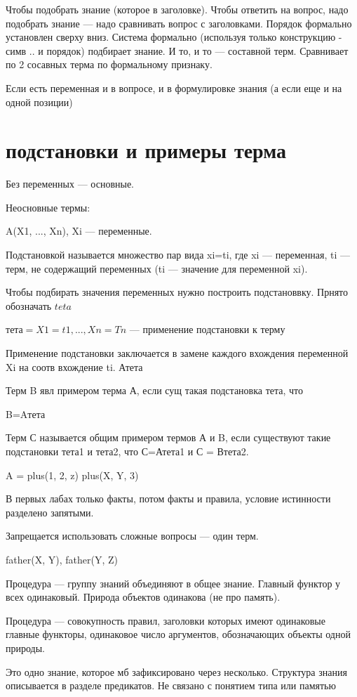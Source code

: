 Чтобы подобрать знание (которое в заголовке). Чтобы ответить на вопрос, надо подобрать знание — надо сравнивать вопрос с заголовками. Порядок формально установлен сверху вниз. Система формально (используя только конструкцию - симв .. и порядок) подбирает знание. И то, и то — составной терм. Сравнивает по 2 сосавных терма по формальному признаку.

Если есть переменная и в вопросе, и в формулировке знания (а если еще и на одной позиции)

\section*{подстановки и примеры терма}

Без переменных — основные.

Неосновные термы:

A(X1, ..., Xn), Xi — переменные.

Подстановкой называется множество пар вида {xi=ti}, где xi — переменная, ti — терм, не содержащий переменных (ti — значение для переменной xi).

Чтобы подбирать значения переменных нужно построить подстановвку. Прнято обозначать $teta$


$тета = {X1=t1, ..., Xn=Tn}$ — применение подстановки к терму


Применение подстановки заключается в замене каждого вхождения переменной Xi на соотв вхождение ti. Атета

Терм B явл примером терма А, если сущ такая подстановка тета, что

B=Aтета


Терм С называется общим примером термов А и B, если существуют такие подстановки тета1 и тета2, что С=Атета1 и С = Втета2.


A = plus(1, 2, z)
plus(X, Y, 3)


В первых лабах только факты, потом факты и правила, условие истинности разделено запятыми.

Запрещается использовать сложные вопросы — один терм.

father(X, Y), father(Y, Z)


Процедура — группу знаний объединяют в общее знание. Главный функтор у всех одинаковый. Природа объектов одинакова (не про память).

Процедура — совокупность правил, заголовки которых имеют одинаковые главные функторы, одинаковое число аргументов, обозначающих объекты одной природы.

Это одно знание, которое мб зафиксировано через несколько. Структура знания описывается в разделе предикатов. Не связано с понятием типа или памятью


